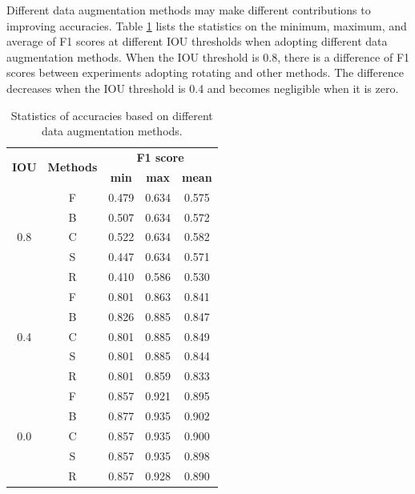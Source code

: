 \documentclass[authoryear,preprint,review,12pt]{elsarticle}
\begin{document}
Different data augmentation methods may make different contributions to improving accuracies. Table \ref{table_stastic_imgaug} lists the statistics on the minimum, maximum, and average of F1 scores at different IOU thresholds when adopting different data augmentation methods. 
When the IOU threshold is 0.8, there is a difference of F1 scores between experiments adopting rotating and other methods. The difference decreases when the IOU threshold is 0.4 and becomes negligible when it is zero. 


\begin{table}[ht]
\centering
\footnotesize
\caption{Statistics of accuracies based on different data augmentation methods.}
\label{table_stastic_imgaug}
\begin{tabular}{c c c c  c  }
\toprule
\multirow{2}{*}{\textbf{IOU}}&\multirow{2}{*}{\textbf{Methods}}& \multicolumn{3}{c}{ \textbf{F1 score}} \\
 & &\textbf{min}&\textbf{max}&\textbf{mean}\\
\midrule
\multirow{5}{*}{0.8} & F &     0.479 & 0.634 & 0.575 \\
&      B & 0.507 & 0.634 & 0.572 \\
&      C & 0.522 & 0.634 & 0.582 \\
&      S & 0.447 & 0.634 & 0.571 \\
&      R & 0.410 & 0.586 & 0.530 \\

\midrule
\multirow{5}{*}{0.4}&      F & 0.801 & 0.863 & 0.841 \\
&      B & 0.826 & 0.885 & 0.847 \\
&      C & 0.801 & 0.885 & 0.849 \\
&      S & 0.801 & 0.885 & 0.844 \\
&      R & 0.801 & 0.859 & 0.833 \\

\midrule
\multirow{5}{*}{0.0} &     F & 0.857 & 0.921 & 0.895 \\
&      B & 0.877 & 0.935 & 0.902 \\
&      C & 0.857 & 0.935 & 0.900 \\
&      S & 0.857 & 0.935 & 0.898 \\
&      R & 0.857 & 0.928 & 0.890 \\


\bottomrule
\end{tabular}
\end{table}
\end{document}
